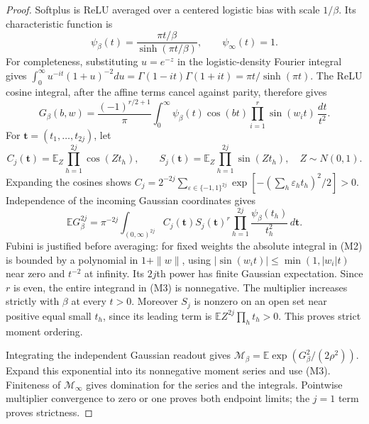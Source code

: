 \documentclass[11pt]{article}
\newcommand{\E}{\mathbb E}\newcommand{\R}{\mathbb R}
\begin{document}
\begin{proof}
Softplus is ReLU averaged over a centered logistic bias with scale
$1/\beta$. Its characteristic function is
\[
        \psi_\beta(t)=\frac{\pi t/\beta}{\sinh(\pi t/\beta)},
        \qquad \psi_\infty(t)=1.
\]
For completeness, substituting $u=e^{-z}$ in the logistic-density
Fourier integral gives
$\int_0^\infty u^{-it}(1+u)^{-2}du
=\Gamma(1-it)\Gamma(1+it)=\pi t/\sinh(\pi t)$.
The ReLU cosine integral, after the affine terms cancel against parity,
therefore gives
\[
 G_\beta(b,w)=\frac{(-1)^{r/2+1}}\pi
       \int_0^\infty \psi_\beta(t)\cos(bt)
                    \prod_{i=1}^r\sin(w_it)\,\frac{dt}{t^2}.
                                                               \tag{M2}
\]
For $\mathbf t=(t_1,\ldots,t_{2j})$, let
\[
 C_j(\mathbf t)=\E_Z\prod_{h=1}^{2j}\cos(Zt_h),\qquad
 S_j(\mathbf t)=\E_Z\prod_{h=1}^{2j}\sin(Zt_h),
                      \quad Z\sim N(0,1).
\]
Expanding the cosines shows
$C_j=2^{-2j}\sum_{\varepsilon\in\{-1,1\}^{2j}}
\exp[-(\sum_h\varepsilon_ht_h)^2/2]>0$.
Independence of the incoming Gaussian coordinates gives
\[
 \E G_\beta^{2j}=\pi^{-2j}\int_{(0,\infty)^{2j}}
       C_j(\mathbf t)S_j(\mathbf t)^r
                    \prod_{h=1}^{2j}\frac{\psi_\beta(t_h)}{t_h^2}
                         \,d\mathbf t.                 \tag{M3}
\]
Fubini is justified before averaging: for fixed weights the absolute
integral in (M2) is bounded by a polynomial in $1+\|w\|$, using
$|\sin(w_it)|\le\min(1,|w_i|t)$ near zero and $t^{-2}$ at infinity.
Its $2j$th power has finite Gaussian expectation.
Since $r$ is even, the entire integrand in (M3) is nonnegative.
The multiplier increases strictly with $\beta$ at every $t>0$.
Moreover $S_j$ is nonzero on an open set near positive equal small
$t_h$, since its leading term is
$\E Z^{2j}\prod_h t_h>0$. This proves strict moment ordering.

Integrating the independent Gaussian readout gives
$\mathcal M_\beta=\E\exp(G_\beta^2/(2\rho^2))$.
Expand this exponential into its nonnegative moment series and use
(M3). Finiteness of $\mathcal M_\infty$ gives domination for the
series and the integrals. Pointwise multiplier convergence to zero
or one proves both endpoint limits; the $j=1$ term proves strictness.
\end{proof}
\end{document}
